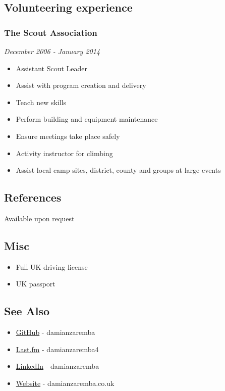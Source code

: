 \subsection{Volunteering experience}

\subsubsection{The Scout Association}

\emph{December 2006 - January 2014}

\begin{itemize}
\item
  Assistant Scout Leader
\item
  Assist with program creation and delivery
\item
  Teach new skills
\item
  Perform building and equipment maintenance
\item
  Ensure meetings take place safely
\item
  Activity instructor for climbing
\item
  Assist local camp sites, district, county and groups at large events
\end{itemize}

\subsection{References}

Available upon request

\subsection{Misc}

\begin{itemize}
\item
  Full UK driving license
\item
  UK passport
\end{itemize}

\subsection{See Also}

\begin{itemize}
\item
  \href{https://github.com/damianzaremba}{GitHub} - damianzaremba
\item
  \href{http://last.fm/user/damianzaremba4}{Last.fm} - damianzaremba4
\item
  \href{http://uk.linkedin.com/in/damianzaremba}{LinkedIn} -
  damianzaremba
\item
  \href{http://damianzaremba.co.uk}{Website} - damianzaremba.co.uk
\end{itemize}
